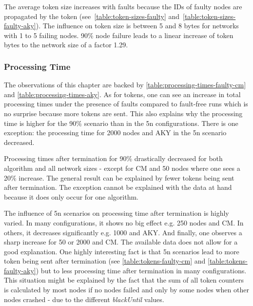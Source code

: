 The average token size increases with faults because the IDs of faulty nodes are propagated by the token (see~\cref{table:token-sizes-faulty} and~\ref{table:token-sizes-faulty-aky}).
The influence on token size is between 5 and 8 bytes for networks with 1 to 5 failing nodes.  %
90\% node failure leads to a linear increase of token bytes to the network size of a factor 1.29. %


\subsubsection{Processing Time}
The observations of this chapter are backed by \cref{table:processing-times-faulty-cm} and \ref{table:processing-times-aky}.
As for tokens, one can see an increase in total processing times under the presence of faults compared to fault-free runs which is no surprise because more tokens are sent.
This also explains why the processing time is higher for the 90\% scenario than in the 5n configurations.
There is one exception: the processing time for 2000 nodes and AKY in the 5n scenario decreased.

Processing times after termination for 90\% drastically decreased for both algorithm and all network sizes - except for CM and 50 nodes where one sees a 20\% increase.
The general result can be explained by fewer tokens being sent after termination.
The exception cannot be explained with the data at hand because it does only occur for one algorithm.

The influence of 5n scenarios on processing time after termination is highly varied.
In many configurations, it shows no big effect e.g. 250 nodes and CM.
In others, it decreases significantly e.g. 1000 and AKY.
And finally, one observes a sharp increase for 50 or 2000 and CM.
The available data does not allow for a good explanation.
One highly interesting fact is that 5n scenarios lead to more token being sent after termination (see \cref{table:tokens-faulty-cm} and \ref{table:tokens-faulty-aky}) but to less processing time after termination in many configurations.
This situation might be explained by the fact that the sum of all token counters is calculated by most nodes if no nodes failed and only by some nodes when other nodes crashed - due to the different \textit{blackUntil} values.


